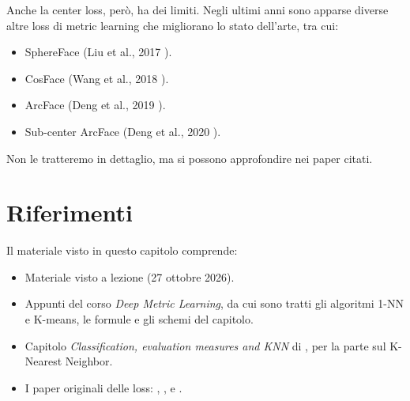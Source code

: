 Anche la center loss, però, ha dei limiti. Negli ultimi anni sono apparse diverse altre loss di metric learning che migliorano lo stato dell'arte, tra cui:
\begin{itemize}
    \item SphereFace (Liu et al., 2017 \cite{Liu2017}).
    \item CosFace (Wang et al., 2018 \cite{Wang2018}).
    \item ArcFace (Deng et al., 2019 \cite{Deng2019}).
    \item Sub-center ArcFace (Deng et al., 2020 \cite{Deng2020}).
\end{itemize}
Non le tratteremo in dettaglio, ma si possono approfondire nei paper citati.

\section*{Riferimenti}
Il materiale visto in questo capitolo comprende:
\begin{itemize}
    \item Materiale visto a lezione (27 ottobre 2026).
    \item Appunti del corso \emph{Deep Metric Learning}, da cui sono tratti gli algoritmi 1-NN e K-means, le formule e gli schemi del capitolo.
    \item Capitolo \emph{Classification, evaluation measures and KNN} di \cite{Furnari-FAD}, per la parte sul K-Nearest Neighbor.
    \item I paper originali delle loss:  \cite{Chopra2005},  \cite{Schroff2015},  \cite{Chen2017} e  \cite{Wen2016}.
\end{itemize}
